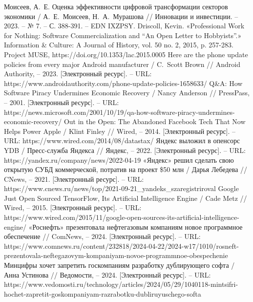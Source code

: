 \documentclass{article}
\begin{document}
\begin{thebibliography}{2}
 Моисеев, А.~Е. Оценка эффективности цифровой трансформации секторов экономики / А.~Е.~Моисеев, Н.~А.~Мурашова // Инновации и инвестиции. – 2023. – № 7. – С. 388-391. – EDN IXZPSY.
 Driscoll, Kevin. «Professional Work for Nothing: Software Commercialization and “An Open Letter to Hobbyists”.» Information \& Culture: A Journal of History, vol. 50 no. 2, 2015, p. 257-283. Project MUSE, https://doi.org/10.1353/lac.2015.0005
 Here are the phone update policies from every major Android manufacturer / C.~Scott Brown // Android Authority, – 2023. [Электронный ресурс]. – URL: https://www.androidauthority.com/phone-update-policies-1658633/
 Q\&A: How Software Piracy Undermines Economic Recovery / Nancy Anderson // PressPass, – 2001. [Электронный ресурс]. – URL: https://news.microsoft.com/2001/10/19/qa-how-software-piracy-undermines-economic-recovery/
 Out in the Open: The Abandoned Facebook Tech That Now Helps Power Apple / Klint Finley // Wired, – 2014. [Электронный ресурс]. – URL: https://www.wired.com/2014/08/datastax/
 Яндекс выложил в опенсорс YDB / Пресс-служба Яндекса // Яндекс, – 2022. [Электронный ресурс]. – URL: https://yandex.ru/company/news/2022-04-19
 «Яндекс» решил сделать свою открытую СУБД коммерческой, потратив на проект \$50 млн / Дарья Лебедева // CNews, – 2021. [Электронный ресурс]. – URL: https://www.cnews.ru/news/top/2021-09-21\_yandeks\_szaregistriroval
 Google Just Open Sourced TensorFlow, Its Artificial Intelligence Engine / Cade Metz // Wired, – 2015. [Электронный ресурс]. – URL: https://www.wired.com/2015/11/google-open-sources-its-artificial-intelligence-engine/
 «Роснефть» презентовала нефтегазовым компаниям новое программное обеспечение // ComNews, – 2024. [Электронный ресурс]. – URL: https://www.comnews.ru/content/232818/2024-04-22/2024-w17/1010/rosneft-prezentovala-neftegazovym-kompaniyam-novoe-programmnoe-obespechenie
 Минцифры хочет запретить госкомпаниям разработку дублирующего софта / Анна Устинова // Ведомости, – 2024. [Электронный ресурс]. – URL: https://www.vedomosti.ru/technology/articles/2024/05/29/1040118-mintsifri-hochet-zapretit-goskompaniyam-razrabotku-dubliruyuschego-softa

\end{thebibliography}
\end{document}
